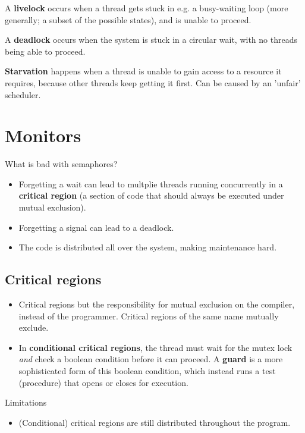 A \textbf{livelock} occurs when a thread gets stuck in e.g. a busy-waiting loop (more generally; a subset of the possible states), and is unable to proceed.

A \textbf{deadlock} occurs when the system is stuck in a circular wait, with no threads being able to proceed. 

\textbf{Starvation} happens when a thread is unable to gain access to a resource it requires, because other threads keep getting it first. Can be caused by an 'unfair' scheduler.

\section{Monitors}
What is bad with semaphores?
\begin{itemize}
    \item Forgetting a wait can lead to multplie threads running concurrently in a \textbf{critical region} (a section of code that should always be executed under mutual exclusion).
    \item Forgetting a signal can lead to a deadlock.
    \item The code is distributed all over the system, making maintenance hard.
\end{itemize}

\subsection{Critical regions}
\begin{itemize}
    \item Critical regions but the responsibility for mutual exclusion on the compiler, instead of the programmer. Critical regions of the same name mutually exclude.
    \item In \textbf{conditional critical regions}, the thread must wait for the mutex lock \emph{and} check a boolean condition before it can proceed. A \textbf{guard} is a more sophisticated form of this boolean condition, which instead runs a test (procedure) that opens or closes for execution.
\end{itemize}
Limitations
\begin{itemize}
    \item (Conditional) critical regions are still distributed throughout the program.
\end{itemize}

